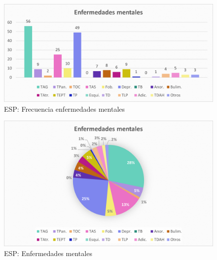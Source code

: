 \documentclass[12pt, a4paper,twoside,titlepage]{book}
\begin{document}
\begin{figure}
    \centering
    \includegraphics[width=.8\linewidth]{ANEXO ESP/22AnexESPEnf}
    \caption{ESP: Frecuencia enfermedades mentales}
    \label{fig:ESPTenidas}
\end{figure}
\begin{figure}
    \centering
    \includegraphics[width=.8\linewidth]{ANEXO ESP/23AnexESPEnf}
    \caption{ESP: Enfermedades mentales}
\end{figure}
\end{document}
